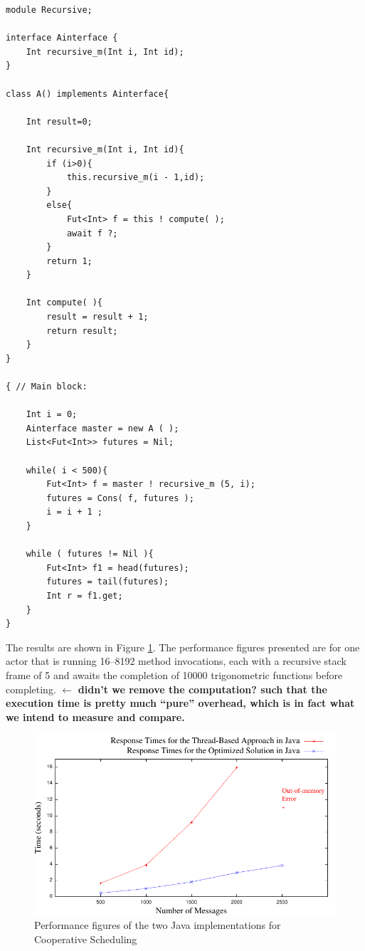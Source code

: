 \begin{lstlisting}[caption= ABS Example, label=absex]
module Recursive;

interface Ainterface {
	Int recursive_m(Int i, Int id);
}

class A() implements Ainterface{

	Int result=0;
	
	Int recursive_m(Int i, Int id){
		if (i>0){
			this.recursive_m(i - 1,id);	
		}
		else{
			Fut<Int> f = this ! compute( );
			await f ?;
		}
		return 1;
	}
	
	Int compute( ){
		result = result + 1;
		return result;
	}
}

{ // Main block:

	Int i = 0;	
	Ainterface master = new A ( );
	List<Fut<Int>> futures = Nil;
	
	while( i < 500){		
		Fut<Int> f = master ! recursive_m (5, i);
		futures = Cons( f, futures );
		i = i + 1 ;
	}
	
	while ( futures != Nil ){
		Fut<Int> f1 = head(futures);
		futures = tail(futures);
		Int r = f1.get;
	}
}
\end{lstlisting}

\par The results are shown in
Figure \ref{jj}. The performance figures presented are for one
actor that is running 16--8192 method invocations, each with a
recursive stack frame of 5 and awaits the
completion of 10000 trigonometric functions before completing. 
$\leftarrow$ {\bfseries didn't we remove the computation? such that the execution time is pretty much ``pure'' overhead, which is in fact what we intend to measure and compare.}


\begin{figure}
	\label{jj}
	\centering
	\includegraphics[scale=1]{jaj8.pdf}
	\caption{Performance figures of the two Java implementations for Cooperative Scheduling}
\end{figure}

